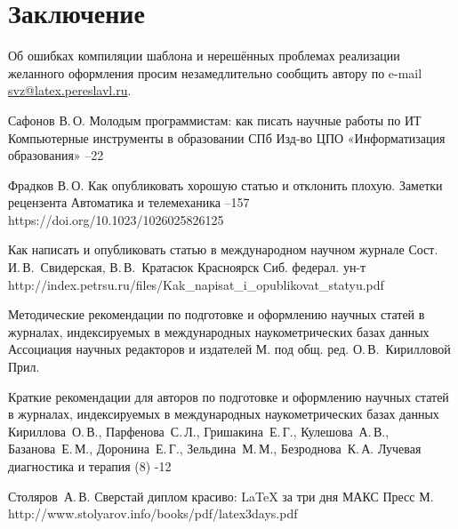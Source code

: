 \documentclass{psta}%
\begin{document}
\section*{Заключение}


Об ошибках компиляции шаблона и нерешённых проблемах реализации желанного оформления просим незамедлительно сообщить автору по e-mail
\href{mailto:svz@latex.pereslavl.ru}{svz@latex.pereslavl.ru}.

\begin{thebibliography}{9}

\by Сафонов В.\,О.
\paper Молодым программистам: как писать научные работы по ИТ
\jour Компьютерные инструменты в образовании
\publaddr СПб
\publ Изд-во ЦПО «Информатизация образования»
--22

\by Фрадков В.\,О.
\paper Как опубликовать хорошую статью и отклонить плохую. Заметки рецензента
\jour Автоматика и телемеханика
--157
\doi https://doi.org/10.1023/1026025826125

\eprint Как написать и опубликовать статью в международном научном журнале
\eprintinfo Сост. И.\,В.~Свидерская, В.\,В.~Кратасюк
\publaddr Красноярск
\publ Сиб. федерал. ун-т
\URL http://index.petrsu.ru/files/Kak_napisat_i_opublikovat_statyu.pdf

\eprint Методические рекомендации по подготовке и оформлению научных статей в журналах, индексируемых в международных наукометрических базах данных
\publ Ассоциация научных редакторов и издателей
\publaddr М.
\eprintinfo под общ. ред.  О.\,В.~Кирилловой
\miscnote Прил.

\paper Краткие рекомендации для авторов по подготовке и оформлению научных статей в журналах, индексируемых в международных наукометрических базах данных
\by Кириллова~О.\,В., Парфенова~С.\,Л., Гришакина~Е.\,Г., Кулешова~А.\,В., Базанова~Е.\,М., Доронина~Е.\,Г., Зельдина~М.\,М., Безроднова~К.\,А.
\jour Лучевая диагностика и терапия
(8)
-12

\by Столяров~А.\,В.
\book Сверстай диплом красиво: LaTeX за три дня
\publ МАКС Пресс
\publaddr М.
\URL http://www.stolyarov.info/books/pdf/latex3days.pdf


\end{thebibliography}
\end{document}

